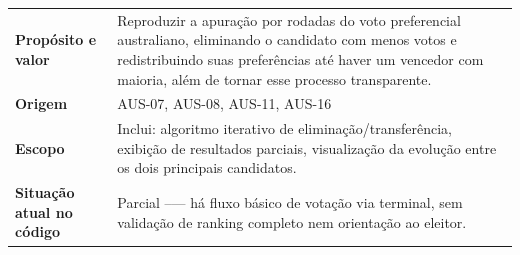 \documentclass[12pt,a4paper]{article}
\begin{document}
\renewcommand{\arraystretch}{1.5}
\begin{table}[H]
    \centering
    \begin{tabular}{|m{4.5cm} | m{11cm}|}
    \hline
    
    \textbf{Propósito e valor} &
    Reproduzir a apuração por rodadas do voto preferencial australiano, eliminando o candidato com menos votos e redistribuindo suas preferências até haver um vencedor com maioria, além de tornar esse processo transparente. \\
    
    \textbf{Origem} &
    AUS-07, AUS-08, AUS-11, AUS-16 \\
    
    \textbf{Escopo} &
    Inclui: algoritmo iterativo de eliminação/transferência, exibição de resultados parciais, visualização da evolução entre os dois principais candidatos. \\
    
    
    \textbf{Situação atual no código} &
    Parcial --— há fluxo básico de votação via terminal, sem validação de ranking completo nem orientação ao eleitor. \\
    
    \hline
    \end{tabular}
\end{table}
\end{document}
